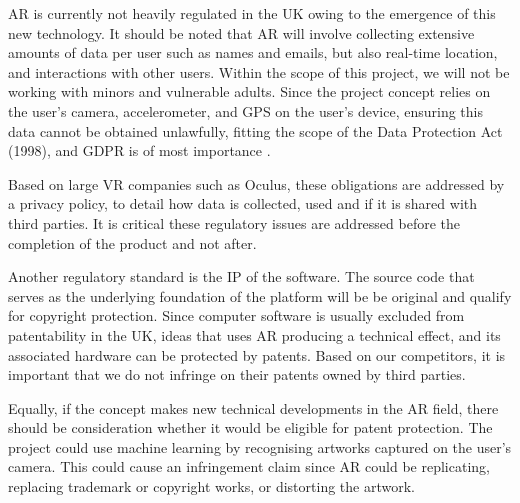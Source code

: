 
AR is currently not heavily regulated in the UK owing to the emergence of this new technology. It should be noted that AR will involve collecting extensive amounts of data per user such as names and emails, but also real-time location, and interactions with other users. Within the scope of this project, we will not be working with minors and vulnerable adults. Since the project concept relies on the user's camera, accelerometer, and GPS on the user's device, ensuring this data cannot be obtained unlawfully, fitting the scope of the Data Protection Act (1998), and GDPR is of most importance \cite{ITProPortal}.

Based on large VR companies such as Oculus, these obligations are addressed by a privacy policy, to detail how data is collected, used and if it is shared with third parties. It is critical these regulatory issues are addressed before the completion of the product and not after.

Another regulatory standard is the IP of the software. The source code that serves as the underlying foundation of the platform will be be original and qualify for copyright protection. Since computer software is usually excluded from patentability in the UK, ideas that uses AR producing a technical effect, and its associated hardware can be protected by patents. Based on our competitors, it is important that we do not infringe on their patents owned by third parties.

Equally, if the concept makes new technical developments in the AR field, there should be consideration whether it would be eligible for patent protection. The project could use machine learning by recognising artworks captured on the user's camera. This could cause an infringement claim since AR could be replicating, replacing trademark or copyright works, or distorting the artwork.